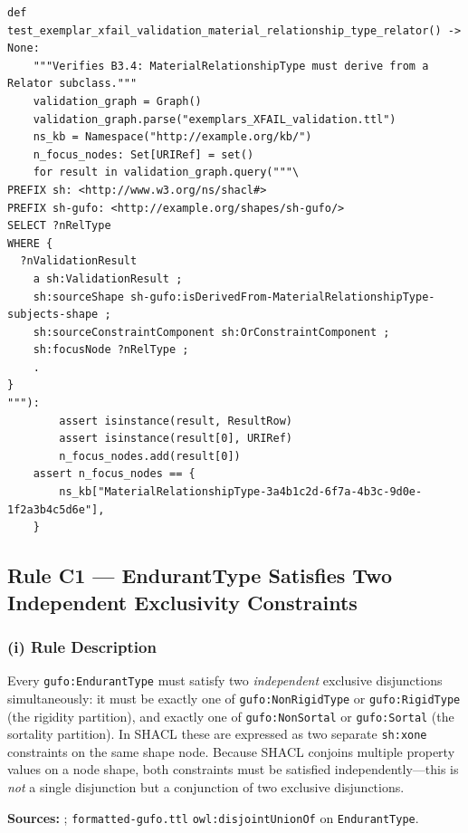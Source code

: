 \documentclass[12pt,a4paper]{article}
\newcommand{\gufoclass}[1]{\nolinkurl{gufo:#1}}
\newcommand{\shprop}[1]{\nolinkurl{sh:#1}}
\begin{document}
\begin{lstlisting}[style=pythonstyle]
def test_exemplar_xfail_validation_material_relationship_type_relator() -> None:
    """Verifies B3.4: MaterialRelationshipType must derive from a Relator subclass."""
    validation_graph = Graph()
    validation_graph.parse("exemplars_XFAIL_validation.ttl")
    ns_kb = Namespace("http://example.org/kb/")
    n_focus_nodes: Set[URIRef] = set()
    for result in validation_graph.query("""\
PREFIX sh: <http://www.w3.org/ns/shacl#>
PREFIX sh-gufo: <http://example.org/shapes/sh-gufo/>
SELECT ?nRelType
WHERE {
  ?nValidationResult
    a sh:ValidationResult ;
    sh:sourceShape sh-gufo:isDerivedFrom-MaterialRelationshipType-subjects-shape ;
    sh:sourceConstraintComponent sh:OrConstraintComponent ;
    sh:focusNode ?nRelType ;
    .
}
"""):
        assert isinstance(result, ResultRow)
        assert isinstance(result[0], URIRef)
        n_focus_nodes.add(result[0])
    assert n_focus_nodes == {
        ns_kb["MaterialRelationshipType-3a4b1c2d-6f7a-4b3c-9d0e-1f2a3b4c5d6e"],
    }
\end{lstlisting}

\subsection{Rule C1 --- EndurantType Satisfies Two Independent Exclusivity Constraints}
\label{sec:rule-c1}

\subsubsection*{(i) Rule Description}

Every \gufoclass{EndurantType} must satisfy two \emph{independent} exclusive
disjunctions simultaneously: it must be exactly one of \gufoclass{NonRigidType}
or \gufoclass{RigidType} (the rigidity partition), and exactly one of
\gufoclass{NonSortal} or \gufoclass{Sortal} (the sortality partition). In SHACL
these are expressed as two separate \shprop{xone} constraints on the same shape
node. Because SHACL conjoins multiple property values on a node shape, both
constraints must be satisfied independently---this is \emph{not} a single
disjunction but a conjunction of two exclusive disjunctions.

\textbf{Sources:} \citet{guizzardi2018}; \texttt{formatted-gufo.ttl}
\nolinkurl{owl:disjointUnionOf} on \texttt{EndurantType}.
\end{document}
